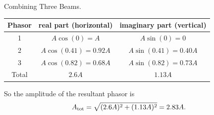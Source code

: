 \begin{example}{Combining Three Beams.}
\begin{solution}
\renewcommand{\arraystretch}{2.0}
\begin{center}
\begin{tabular}{|c|c|c|}\hline
\quad Phasor\quad &
\quad real part (horizontal) \quad &
\quad imaginary part (vertical) \quad \\ 
\hline\hline
1      & $A\cos\left(0\right) = A$ & $A\sin\left(0\right) = 0$ \\
\hline
2      & $A\cos\left(0.41\right)= 0.92A$ & $A\sin\left(0.41\right) = 0.40A$ \\
\hline
3      & $A\cos\left(0.82\right)=0.68A$ & $A\sin\left(0.82\right)=0.73A$ \\
\hline
\hline
Total  & $2.6A$   & $1.13A$ \\
\hline
\end{tabular}
\end{center}
\renewcommand{\arraystretch}{1.0}

So the amplitude of the resultant phasor is 
\begin{equation}
A_{\rm tot} = \sqrt{(2.6A)^2 + (1.13A)^2} = 2.83A.
\end{equation}
\end{solution}
\end{example}

